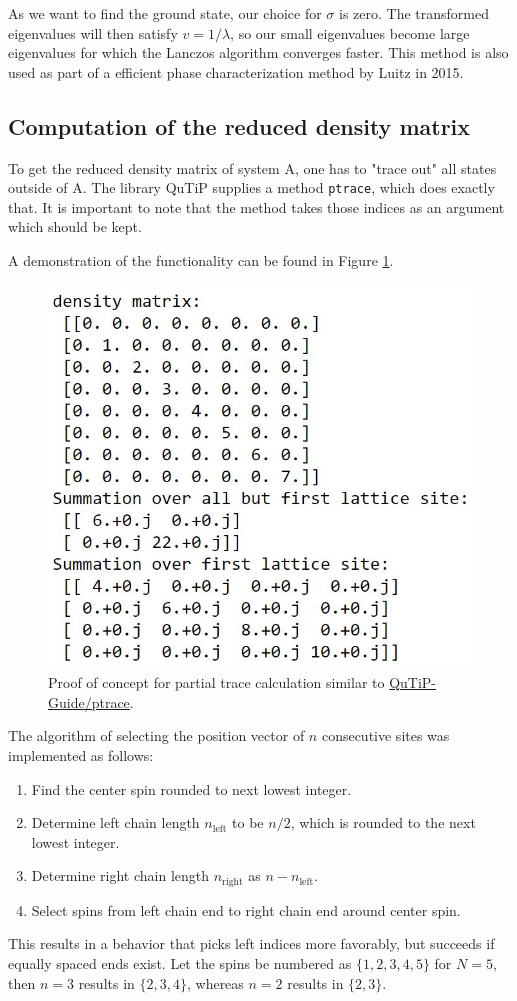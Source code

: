 \documentclass[reprint,amsmath,amssymb,aps,prb]{revtex4-2}
\begin{document}
As we want to find the ground state, our choice for $\sigma$ is zero. The transformed eigenvalues will then satisfy $v=1/\lambda$, so our small eigenvalues  become large eigenvalues for which the Lanczos algorithm converges faster.\cite{Virtanen_2020} This method is also used as part of a efficient phase characterization method by Luitz in 2015.\cite{Luitz2015}

\subsection{Computation of the reduced density matrix}

To get the reduced density matrix of system A, one has to "trace out" all states outside of A. The library QuTiP supplies a method \texttt{ptrace}, which does exactly that. It is important to note that the method takes those indices as an argument which should be kept.\cite{Johansson2012}

A demonstration of the functionality can be found in Figure \ref{fig:partialtrace_proof_of_concept}.

\begin{figure}[h!]
\centering
\includegraphics[width=0.7\linewidth]{figures/partialtrace_proof_of_concept}
\caption{Proof of concept for partial trace calculation similar to \protect\hyperlink{http://qutip.org/docs/3.1.0/guide/guide-tensor.html}{QuTiP-Guide/ptrace}.}
\label{fig:partialtrace_proof_of_concept}
\end{figure}

The algorithm of selecting the position vector of $n$ consecutive sites was implemented as follows: 
\begin{enumerate}
	\item Find the center spin rounded to next lowest integer.
	\item Determine left chain length $n_\text{left}$ to be $n/2$, which is rounded to the next lowest integer.
	\item Determine right chain length $n_\text{right}$ as $n-n_\text{left}$.
	\item Select spins from left chain end to right chain end around center spin.
\end{enumerate}
This results in a behavior that picks left indices more favorably, but succeeds if equally spaced ends exist. Let the spins be numbered as $\{1, 2, 3, 4, 5\}$ for $N=5$, then  $n=3$ results in $\{2, 3, 4\}$, whereas $n=2$ results in $\{2, 3\}$.
\end{document}
